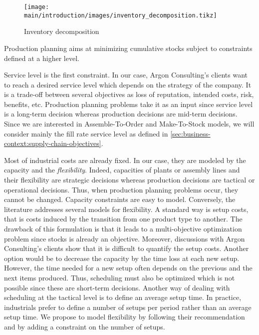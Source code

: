 \begin{figure}[h]
  \centering
  \texttt{[image: main/introduction/images/inventory\_decomposition.tikz]}
  \caption{Inventory decomposition}
  \label{fig:inventory-decomposition}
\end{figure}


\medskip


Production planning aims at minimizing cumulative stocks subject to constraints defined at a higher level.


Service level is the first constraint.
In our case, Argon Consulting's clients want to reach a desired service level which depends on the strategy of the company.
It is a trade-off between several objectives as loss of reputation, intended costs, risk, benefits, etc.
Production planning problems take it as an input since service level is a long-term decision whereas production decisions are mid-term decisions.
Since we are interested in Assemble-To-Order and Make-To-Stock models, we will consider mainly the fill rate service level as defined in \cref{sec:business-context:supply-chain-objectives}.


Most of industrial costs are already fixed.
In our case, they are modeled by the capacity and the \emph{flexibility}.
Indeed, capacities of plants or assembly lines and their flexibility are strategic decisions whereas production decisions are tactical or operational decisions.
Thus, when production planning problems occur, they cannot be changed.
Capacity constraints are easy to model.
Conversely, the literature addresses several models for flexibility.
A standard way is setup costs, that is costs induced by the transition from one product type to another.
The drawback of this formulation is that it leads to a multi-objective optimization problem since stocks is already an objective.
Moreover, discussions with Argon Consulting's clients show that it is difficult to quantify the setup costs.
Another option would be to decrease the capacity by the time loss at each new setup.
However, the time needed for a new setup often depends on the previous and the next items produced.
Thus, scheduling must also be optimized which is not possible since these are short-term decisions.
Another way of dealing with scheduling at the tactical level is to define an average setup time.
In practice, industrials prefer to define a number of setups per period rather than an average setup time.
We propose to model flexibility by following their recommendation and by adding a constraint on the number of setups.


